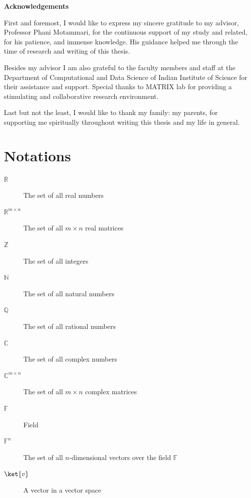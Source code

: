\documentclass[12pt, oneside]{book}
\theoremstyle{definition}
\theoremstyle{definition}
\theoremstyle{remark}
\newcommand{\acknowledgementsname}{Acknowledgements}  %
\newenvironment{Acknowledgements}{%
\clearpage
\null\vfill
\begin{center}%
    \bfseries \acknowledgementsname
\end{center}}%
{\vfill\null}
\begin{document}
\begin{Acknowledgements}
First and foremost, I would like to express my sincere gratitude to my advisor,
Professor Phani Motammari, for the continuous support of my study and related, for
his patience, and immense knowledge.
His guidance helped me through the time of research and writing of this thesis.

Besides my advisor I am also grateful to the faculty members and staff at the
Department of Computational and Data Science of Indian Institute of Science for
their assistance and support. Special thanks to MATRIX lab for providing a stimulating
and collaborative research environment.

Last but not the least, I would like to thank my family: my parents,
for supporting me spiritually throughout writing this thesis and my life in general.
\end{Acknowledgements}

\tableofcontents  %

\listoffigures  %

\listoftables  %

\chapter*{Notations} %

\begin{description}
    \item[$\mathbb{R}$] The set of all real numbers
    \item[$\mathbb{R}^{m \times n} $] The set of all $m \times n$ real matrices
    \item[$\mathbb{Z}$] The set of all integers
    \item[$\mathbb{N}$] The set of all natural numbers
    \item[$\mathbb{Q}$] The set of all rational numbers
    \item[$\mathbb{C}$] The set of all complex numbers
    \item[$\mathbb{C}^{m \times n}$] The set of all $m \times n$ complex matrices
    \item[$\mathbb{F}$] Field
    \item[$\mathbb{F}^{n}$] The set of all $n$-dimensional vectors over the field $\mathbb{F}$
    \item[$\ket{v}$] A vector in a vector space
\end{description}
\end{document}

